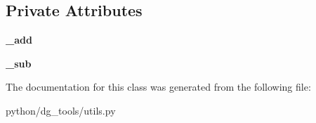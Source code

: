 \subsection*{Private Attributes}
\begin{DoxyCompactItemize}
\item 
{\bfseries \+\_\+add}\hypertarget{classpython_1_1dg__tools_1_1utils_1_1VectorSignal_a42059402a4d2713501869eb2e7053678}{}\label{classpython_1_1dg__tools_1_1utils_1_1VectorSignal_a42059402a4d2713501869eb2e7053678}

\item 
{\bfseries \+\_\+sub}\hypertarget{classpython_1_1dg__tools_1_1utils_1_1VectorSignal_a3fcd7d6305415fc5b67985962bcfa0fe}{}\label{classpython_1_1dg__tools_1_1utils_1_1VectorSignal_a3fcd7d6305415fc5b67985962bcfa0fe}

\end{DoxyCompactItemize}


The documentation for this class was generated from the following file\+:\begin{DoxyCompactItemize}
\item 
python/dg\+\_\+tools/utils.\+py\end{DoxyCompactItemize}
